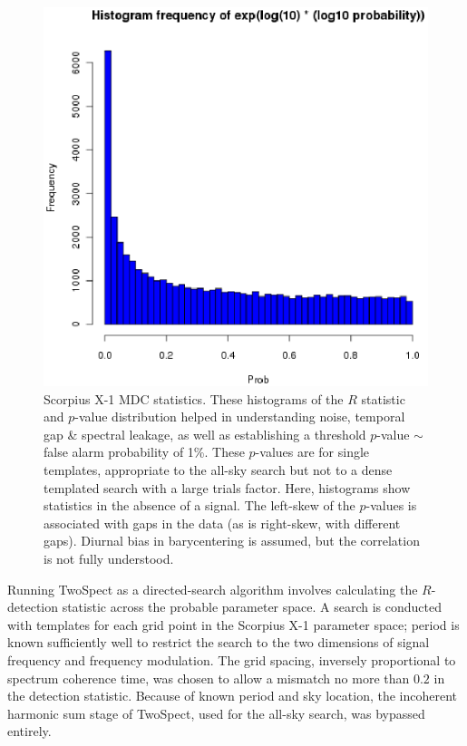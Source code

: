 \begin{figure}
\begin{center}
\includegraphics[width=0.6\paperwidth,height=0.35\paperheight]{StatHistProbH1.eps}
\caption{Scorpius X-1 MDC statistics. These histograms of the $R$ statistic and $p$-value distribution helped in understanding noise, temporal gap \& spectral leakage, as well as establishing a threshold $p$-value $\sim$ false alarm probability of 1\%.
These $p$-values are for single templates, appropriate to the all-sky search but not to a dense templated search with a large trials factor.
Here, histograms show statistics in the absence of a signal. 
The left-skew of the $p$-values is associated with gaps in the data (as is right-skew, with different gaps).
Diurnal bias in barycentering is assumed, but the correlation is not fully understood.
}
\end{center}
\end{figure}



Running TwoSpect as a directed-search algorithm involves calculating
the $R$-detection statistic across the probable parameter space. 
A search is conducted with templates for each grid point in the Scorpius 
X-1 parameter space; period is known sufficiently well to restrict the search
to the two dimensions of signal frequency and frequency modulation. The
grid spacing, inversely proportional to spectrum coherence time, was
chosen to allow a mismatch no more than $0.2$ in the detection statistic.
Because of known period and sky location, the incoherent harmonic sum stage
of TwoSpect, used for the all-sky search, was bypassed entirely. 

